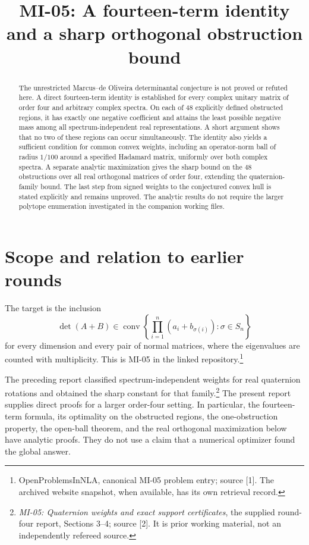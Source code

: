 \documentclass[11pt,a4paper]{article}
\title{MI-05: A fourteen-term identity and a sharp orthogonal obstruction bound}
\author{}\date{}
\newcommand{\conv}{\operatorname{conv}}
\begin{document}
\maketitle
\begin{abstract}
The unrestricted Marcus--de Oliveira determinantal conjecture is not proved or refuted here. A direct fourteen-term identity is established for every complex unitary matrix of order four and arbitrary complex spectra. On each of 48 explicitly defined obstructed regions, it has exactly one negative coefficient and attains the least possible negative mass among all spectrum-independent real representations. A short argument shows that no two of these regions can occur simultaneously. The identity also yields a sufficient condition for common convex weights, including an operator-norm ball of radius $1/100$ around a specified Hadamard matrix, uniformly over both complex spectra. A separate analytic maximization gives the sharp bound on the 48 obstructions over all real orthogonal matrices of order four, extending the quaternion-family bound. The last step from signed weights to the conjectured convex hull is stated explicitly and remains unproved. The analytic results do not require the larger polytope enumeration investigated in the companion working files.
\end{abstract}

\section*{Scope and relation to earlier rounds}
The target is the inclusion
\begin{equation}\label{eq:target}
\det(A+B)\in\conv\left\{\prod_{i=1}^n(a_i+b_{\sigma(i)}):\sigma\in S_n\right\}
\end{equation}
for every dimension and every pair of normal matrices, where the eigenvalues are counted with multiplicity. This is MI-05 in the linked repository.\footnote{OpenProblemsInNLA, canonical MI-05 problem entry; source [1]. The archived website snapshot, when available, has its own retrieval record.}

The preceding report classified spectrum-independent weights for real quaternion rotations and obtained the sharp constant for that family.\footnote{\emph{MI-05: Quaternion weights and exact support certificates}, the supplied round-four report, Sections 3--4; source [2]. It is prior working material, not an independently refereed source.} The present report supplies direct proofs for a larger order-four setting. In particular, the fourteen-term formula, its optimality on the obstructed regions, the one-obstruction property, the open-ball theorem, and the real orthogonal maximization below have analytic proofs. They do not use a claim that a numerical optimizer found the global answer.
\end{document}
